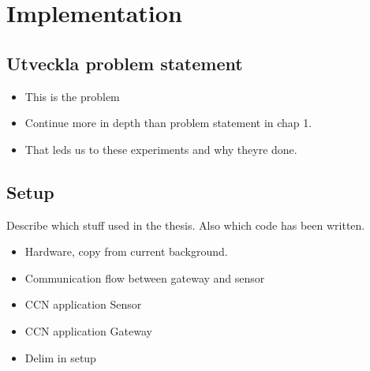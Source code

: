 \section{Implementation}

\subsection{Utveckla problem statement}
\begin{itemize}
\item This is the problem
\item Continue more in depth than problem statement in chap 1.
\item That leds us to these experiments and why theyre done.
\end{itemize}


\subsection{Setup}
Describe which stuff used in the thesis. Also which code has been written.
\begin{itemize}
\item Hardware, copy from current background.
\item Communication flow between gateway and sensor
\item CCN application Sensor
\item CCN application Gateway
\item Delim in setup
\end{itemize}














